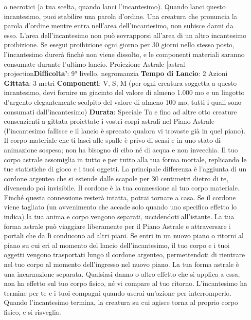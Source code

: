 \begin{multicols}{2}
o necrotici (a tua scelta, quando lanci l’incantesimo).
Quando lanci questo incantesimo, puoi stabilire una
parola d’ordine. Una creatura che pronuncia la parola
d’ordine mentre entra nell’area dell’incantesimo, non
subisce danni da esso.
L’area dell’incantesimo non può sovrapporsi all’area di
un altro incantesimo proibizione. Se esegui proibizione
ogni giorno per 30 giorni nello stesso posto,
l’incantesimo durerà finché non viene dissolto, e le
componenti materiali saranno consumate durante
l’ultimo lancio.
Proiezione Astrale
[astral projection\textbf{Difficolta'}:
9° livello, negromanzia
\textbf{Tempo di Lancio}: 2 Azioni
\textbf{Gittata}: 3 metri
\textbf{Componenti}: V, S, M (per ogni creatura soggetta a
questo incantesimo, devi fornire un giacinto del valore
di almeno 1.000 mo e un lingotto d’argento
elegantemente scolpito del valore di almeno 100 mo,
tutti i quali sono consumati dall’incantesimo)
\textbf{Durata}: Speciale
Tu e fino ad altre otto creature consenzienti a gittata
proiettate i vostri corpi astrali nel Piano Astrale
(l’incantesimo fallisce e il lancio è sprecato qualora vi
trovaste già in quel piano). Il corpo materiale che ti lasci
alle spalle è privo di sensi e in uno stato di animazione
sospesa; non ha bisogno di cibo né di acqua e non
invecchia.
Il tuo corpo astrale assomiglia in tutto e per tutto alla tua
forma mortale, replicando le tue statistiche di gioco e i
tuoi oggetti. La principale differenza è l’aggiunta di un
cordone argenteo che si estende dalle scapole per 30
centimetri dietro di te, divenendo poi invisibile. Il
cordone è la tua connessione al tuo corpo materiale.
Finché questa connessione resterà intatta, potrai
tornare a casa. Se il cordone viene tagliato (un
avvenimento che accade solo quando uno specifico
effetto lo indica) la tua anima e corpo vengono separati,
uccidendoti all’istante.
La tua forma astrale può viaggiare liberamente per il
Piano Astrale e attraversare i portali che da lì
conducono ad altri piani. Se entri in un nuovo piano o
ritorni al piano su cui eri al momento del lancio
dell’incantesimo, il tuo corpo e i tuoi oggetti vengono
trasportati lungo il cordone argenteo, permettendoti di
rientrare nel tuo corpo al momento dell’ingresso nel
nuovo piano. La tua forma astrale è una incarnazione
separata. Qualsiasi danno o altro effetto che si applica
a essa, non ha effetto sul tuo corpo fisico, né vi
compare al tuo ritorno.
L’incantesimo ha termine per te e i tuoi compagni
quando userai un’azione per interromperlo. Quando
l’incantesimo termina, la creatura su cui agisce torna al
proprio corpo fisico, e si risveglia.

\end{multicols}
